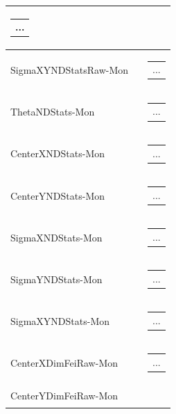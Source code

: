 \documentclass[openany]{article}
\begin{document}
\begin{longtable}{| m{3.0cm} m{4.5cm} m{7.0cm} |}
\begin{tabular}{@{}m{6cm}@{}}
                ...
            \end{tabular} \hypertarget{pv:sigma-xy-ndstats-raw}{}\\ \hline
        SigmaXYNDStatsRaw-Mon &  & \begin{tabular}{@{}m{6cm}@{}}
                ...
            \end{tabular} \hypertarget{pv:theta-ndstats}{}\\ \hline
        ThetaNDStats-Mon &  & \begin{tabular}{@{}m{6cm}@{}}
                ...
            \end{tabular} \hypertarget{pv:center-x-ndstats}{}\\ \hline
        CenterXNDStats-Mon &  & \begin{tabular}{@{}m{6cm}@{}}
                ...
            \end{tabular} \hypertarget{pv:center-y-ndstats}{}\\ \hline
        CenterYNDStats-Mon &  & \begin{tabular}{@{}m{6cm}@{}}
                ...
            \end{tabular} \hypertarget{pv:sigma-x-ndstats}{}\\ \hline
        SigmaXNDStats-Mon &  & \begin{tabular}{@{}m{6cm}@{}}
                ...
            \end{tabular} \hypertarget{pv:sigma-y-ndstats}{}\\ \hline
        SigmaYNDStats-Mon &  & \begin{tabular}{@{}m{6cm}@{}}
                ...
            \end{tabular} \hypertarget{pv:sigma-xy-ndstats}{}\\ \hline
        SigmaXYNDStats-Mon &  & \begin{tabular}{@{}m{6cm}@{}}
                ...
            \end{tabular} \hypertarget{pv:center-x-dimfei-raw}{}\\ \hline
        CenterXDimFeiRaw-Mon &  & \begin{tabular}{@{}m{6cm}@{}}
                ...
            \end{tabular} \hypertarget{pv:center-y-dimfei-raw}{}\\ \hline
        CenterYDimFeiRaw-Mon &  & \begin{tabular}{@{}m{6cm}@{}}

\end{tabular}
\end{longtable}
\end{document}
